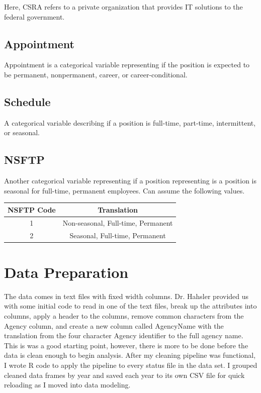 \documentclass{article}
\begin{document}
    Here, CSRA refers to a private organization that provides IT solutions to the federal government.

    \subsection{Appointment}
    Appointment is a categorical variable representing if the position is expected to be permanent, nonpermanent, career, or career-conditional.

    \subsection{Schedule}
    A categorical variable describing if a position is full-time, part-time, intermittent, or seasonal.

    \subsection{NSFTP}
    Another categorical variable representing if a position representing is a position is seasonal for full-time, permanent employees. Can assume the following values.

        \begin{center}
            \begin{tabular}{ |c|c| }
                \hline
                NSFTP Code & Translation \\
                \hline
                1 & Non-seasonal, Full-time, Permanent \\
                2 & Seasonal, Full-time, Permanent \\
                \hline
            \end{tabular}
        \end{center}

\section{Data Preparation}
The data comes in text files with fixed width columns. Dr. Hahsler provided us with some initial code to read in one of the text files, break up the attributes into columns, apply a header to the columns, remove common characters from the Agency column, and create a new column called AgencyName with the translation from the four character Agency identifier to the full agency name. This is was a good starting point, however, there is more to be done before the data is clean enough to begin analysis. After my cleaning pipeline was functional, I wrote R code to apply the pipeline to every status file in the data set. I grouped cleaned data frames by year and saved each year to its own CSV file for quick reloading as I moved into data modeling.
\end{document}
